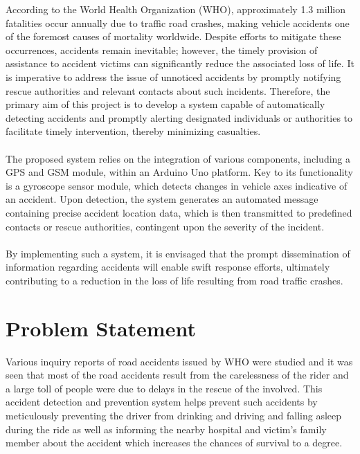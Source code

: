 \documentclass[12pt,a4paper]{report}
\begin{document}
	\begin{justify}

According to the World Health Organization (WHO), approximately 1.3 million fatalities occur annually due to traffic road crashes, making vehicle accidents one of the foremost causes of mortality worldwide. Despite efforts to mitigate these occurrences, accidents remain inevitable; however, the timely provision of assistance to accident victims can significantly reduce the associated loss of life. It is imperative to address the issue of unnoticed accidents by promptly notifying rescue authorities and relevant contacts about such incidents. Therefore, the primary aim of this project is to develop a system capable of automatically detecting accidents and promptly alerting designated individuals or authorities to facilitate timely intervention, thereby minimizing casualties.\\\\
The proposed system relies on the integration of various components, including a GPS and GSM module, within an Arduino Uno platform. Key to its functionality is a gyroscope sensor module, which detects changes in vehicle axes indicative of an accident. Upon detection, the system generates an automated message containing precise accident location data, which is then transmitted to predefined contacts or rescue authorities, contingent upon the severity of the incident.\\\\
By implementing such a system, it is envisaged that the prompt dissemination of information regarding accidents will enable swift response efforts, ultimately contributing to a reduction in the loss of life resulting from road traffic crashes.
	\end{justify}
	
	
	
	\section{Problem Statement}
	
	\begin{justify}
Various inquiry reports of road accidents issued by WHO were studied and it was seen that most of the road accidents result from the carelessness of the rider and a large toll of people were due to delays in the rescue of the involved. This accident detection and prevention system helps prevent such accidents by meticulously preventing the driver from drinking and driving and falling asleep during the ride as well as informing the nearby hospital and victim's family member about the accident which increases the chances of survival to a degree.
	\end{justify}
	
\end{document}
